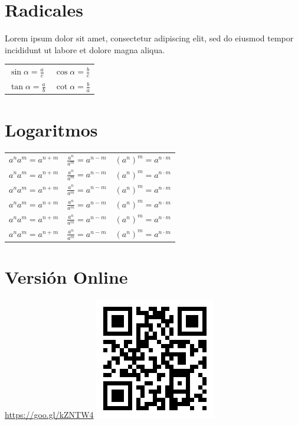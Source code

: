 \documentclass[a4paper,spanish,9pt]{extarticle}
\begin{document}
\begin{multicols*}{2}
\section{Radicales}

Lorem ipsum dolor sit amet, consectetur adipiscing elit, sed do eiusmod tempor incididunt ut labore et dolore magna aliqua. 


\medskip

\begin{tabular}{ll}
$\sin\alpha = \frac{a}{c}$ & $\cos\alpha = \frac{b}{c}$ \\[1ex]
$\tan\alpha = \frac{a}{b}$ & $\cot\alpha = \frac{b}{a}$ \\
\end{tabular}

\section{Logaritmos}

\begin{tabular}{lll}
$a^n a^m = a^{n+m}$ & $\frac{a^n}{a^m} = a^{n-m}$ & $(a^n)^m = a^{n \cdot m}$\\
$a^n a^m = a^{n+m}$ & $\frac{a^n}{a^m} = a^{n-m}$ & $(a^n)^m = a^{n \cdot m}$\\
$a^n a^m = a^{n+m}$ & $\frac{a^n}{a^m} = a^{n-m}$ & $(a^n)^m = a^{n \cdot m}$\\
$a^n a^m = a^{n+m}$ & $\frac{a^n}{a^m} = a^{n-m}$ & $(a^n)^m = a^{n \cdot m}$\\
$a^n a^m = a^{n+m}$ & $\frac{a^n}{a^m} = a^{n-m}$ & $(a^n)^m = a^{n \cdot m}$\\
$a^n a^m = a^{n+m}$ & $\frac{a^n}{a^m} = a^{n-m}$ & $(a^n)^m = a^{n \cdot m}$
\end{tabular}




\section{Versión Online}

\url{https://goo.gl/kZNTW4} \includegraphics[width=0.15\columnwidth]{qr_chuletapot}





\end{multicols*}
\end{document}
